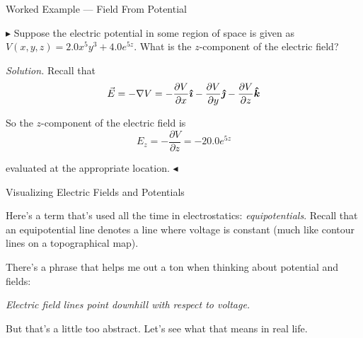 \documentclass{beamer}
\begin{document}
\begin{frame}{Worked Example --- Field From Potential}

$\blacktriangleright$ Suppose the electric potential in some region of space is given as $V(x, y, z) = 2.0 x^5 y^3 + 4.0 e^{5z}$. What is the $z$-component of the electric field?

\vfill

\textit{Solution.} Recall that 
\begin{equation*}
    \vec{E} = -\nabla V = -\frac{\partial V}{\partial x}\bm{\hat{\imath}} - \frac{\partial V}{\partial y}\bm{\hat{\jmath}} - \frac{\partial V}{\partial z} \bm{\hat{k}}
\end{equation*}

So the $z$-component of the electric field is
\begin{equation*}
    E_z = - \frac{\partial V}{\partial z} = -20.0 e^{5z}
\end{equation*}

evaluated at the appropriate location. $\blacktriangleleft$

\end{frame}

\begin{frame}{Visualizing Electric Fields and Potentials}

Here's a term that's used all the time in electrostatics: \emph{equipotentials}. Recall that an equipotential line denotes a line where voltage is constant (much like contour lines on a topographical map).

\vfill

There's a phrase that helps me out a ton when thinking about potential and fields:

\begin{center}
    \emph{Electric field lines point downhill with respect to voltage.}
\end{center}

But that's a little too abstract. Let's see what that means in real life.

\end{frame}
\end{document}
